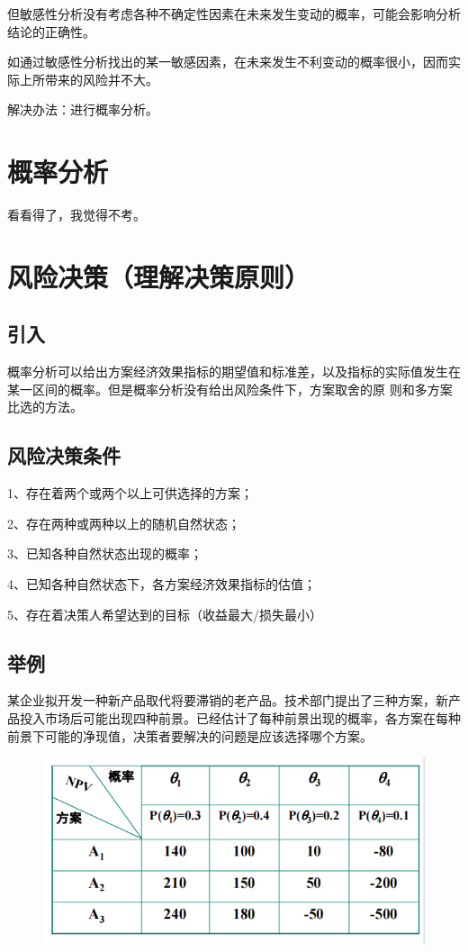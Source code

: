 但敏感性分析没有考虑各种不确定性因素在未来发生变动的概率，可能会影响分析结论的正确性。

如通过敏感性分析找出的某一敏感因素，在未来发生不利变动的概率很小，因而实际上所带来的风险并不大。

解决办法：进行概率分析。

\section{概率分析}
看看得了，我觉得不考。

\section{风险决策（理解决策原则）}
\subsection{引入}
概率分析可以给出方案经济效果指标的期望值和标准差，以及指标的实际值发生在某一区间的概率。但是概率分析没有给出风险条件下，方案取舍的原
则和多方案比选的方法。

\subsection{风险决策条件}
1、存在着两个或两个以上可供选择的方案；

2、存在两种或两种以上的随机自然状态；

3、已知各种自然状态出现的概率；

4、已知各种自然状态下，各方案经济效果指标的估值；

5、存在着决策人希望达到的目标（收益最大/损失最小）

\subsection{举例}
某企业拟开发一种新产品取代将要滞销的老产品。技术部门提出了三种方案，新产品投入市场后可能出现四种前景。已经估计了每种前景出现的概率，各方案在每种前景下可能的净现值，决策者要解决的问题是应该选择哪个方案。

\begin{figure}[H]
    \centering
    \includegraphics[width=0.75\linewidth]{image/风险决策-选哪个方案.png}
\end{figure}

